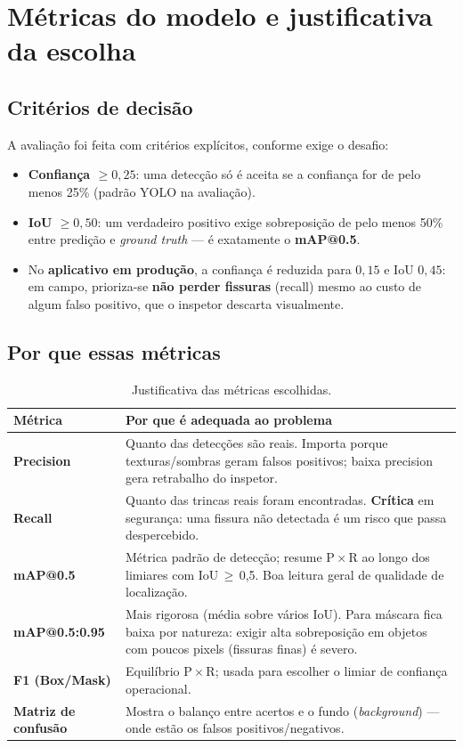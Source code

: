 \documentclass[11pt,a4paper]{article}
\begin{document}
\section{Métricas do modelo e justificativa da escolha}
\subsection{Critérios de decisão}
A avaliação foi feita com critérios explícitos, conforme exige o desafio:
\begin{itemize}[leftmargin=1.4em]
  \item \textbf{Confiança \(\geq 0{,}25\)}: uma detecção só é aceita se a confiança for de pelo
        menos 25\% (padrão YOLO na avaliação).
  \item \textbf{IoU \(\geq 0{,}50\)}: um verdadeiro positivo exige sobreposição de pelo menos
        50\% entre predição e \emph{ground truth} — é exatamente o \textbf{mAP@0.5}.
  \item No \textbf{aplicativo em produção}, a confiança é reduzida para \(0{,}15\) e IoU \(0{,}45\):
        em campo, prioriza-se \textbf{não perder fissuras} (recall) mesmo ao custo de algum falso
        positivo, que o inspetor descarta visualmente.
\end{itemize}

\subsection{Por que essas métricas}
\begin{table}[H]\centering\small
\renewcommand{\arraystretch}{1.3}
\begin{tabular}{>{\bfseries}l >{\raggedright\arraybackslash}p{10.8cm}}
\toprule
Métrica & Por que é adequada ao problema \\
\midrule
Precision & Quanto das detecções são reais. Importa porque texturas/sombras geram falsos
positivos; baixa precision gera retrabalho do inspetor. \\
Recall & Quanto das trincas reais foram encontradas. \textbf{Crítica} em segurança: uma fissura
não detectada é um risco que passa despercebido. \\
mAP@0.5 & Métrica padrão de detecção; resume P\,$\times$\,R ao longo dos limiares com IoU\,$\geq$\,0,5.
Boa leitura geral de qualidade de localização. \\
mAP@0.5:0.95 & Mais rigorosa (média sobre vários IoU). Para máscara fica baixa por natureza:
exigir alta sobreposição em objetos com poucos pixels (fissuras finas) é severo. \\
F1 (Box/Mask) & Equilíbrio P\,$\times$\,R; usada para escolher o limiar de confiança operacional. \\
Matriz de confusão & Mostra o balanço entre acertos e o fundo (\emph{background}) — onde estão
os falsos positivos/negativos. \\
\bottomrule
\end{tabular}
\caption{Justificativa das métricas escolhidas.}
\end{table}
\end{document}
